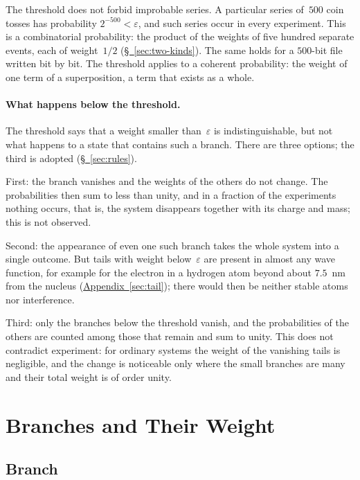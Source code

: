 \documentclass[11pt,a4paper]{article}
\begin{document}
The threshold does not forbid improbable series. A particular series of~$500$ coin tosses has probability $2^{-500}<\varepsilon$, and such series occur in every experiment. This is a combinatorial probability: the product of the weights of five hundred separate events, each of weight~$1/2$ (\hyperref[sec:two-kinds]{\S~\ref*{sec:two-kinds}}). The same holds for a $500$-bit file written bit by bit. The threshold applies to a coherent probability: the weight of one term of a superposition, a term that exists as a whole.

\paragraph{What happens below the threshold.}
The threshold says that a weight smaller than~$\varepsilon$ is indistinguishable, but not what happens to a state that contains such a branch. There are three options; the third is adopted (\hyperref[sec:rules]{\S~\ref*{sec:rules}}).

First: the branch vanishes and the weights of the others do not change. The probabilities then sum to less than unity, and in a fraction of the experiments nothing occurs, that is, the system disappears together with its charge and mass; this is not observed.

Second: the appearance of even one such branch takes the whole system into a single outcome. But tails with weight below~$\varepsilon$ are present in almost any wave function, for example for the electron in a hydrogen atom beyond about $7.5$~nm from the nucleus (\hyperref[sec:tail]{Appendix~\ref*{sec:tail}}); there would then be neither stable atoms nor interference.

Third: only the branches below the threshold vanish, and the probabilities of the others are counted among those that remain and sum to unity. This does not contradict experiment: for ordinary systems the weight of the vanishing tails is negligible, and the change is noticeable only where the small branches are many and their total weight is of order unity.

\section{Branches and Their Weight}
\label{sec:systems}

\subsection{Branch}
\label{sec:branch}
\end{document}
